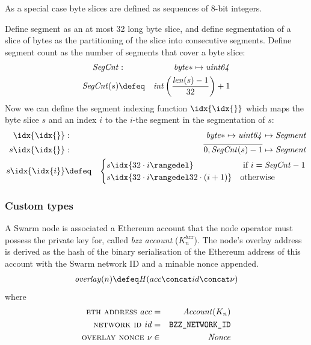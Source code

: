 %
As a special case byte slices are defined as sequences of 8-bit integers.
%
\begin{definition}[segmentation]
\label{def:segmentation}
Define segment as an at most 32 long byte slice, and define  segmentation of a slice of bytes as the partitioning of the slice into consecutive segments. 
%
Define segment count as the number of segments that cover a byte slice:
\begin{eqnarray}
\mathit{SegCnt}&:&\mathit{byte}*\mapsto\mathit{uint64}\\
\mathit{SegCnt}(s)&\defeq&\mathit{int}\left(\frac{\mathit{len}(s)-1}{32}\right)+1 
\end{eqnarray}
%
Now we can define the segment indexing function 
$\idx{\idx{}}$ which maps the byte slice $s$ and an index $i$ to the $i$-the segment in the segmentation of $s$:
\begin{eqnarray}
\idx{\idx{}}& : & \mathit{byte}{*}\mapsto\mathit{uint64}\mapsto\mathit{Segment}\\
s\idx{\idx{}}&:&\overline{0,\mathit{SegCnt}(s)-1}\mapsto\mathit{Segment}\\ 
s\idx{\idx{i}}&\defeq&\begin{cases}s\idx{32\cdot i\rangedel} &\text{ if } i = \mathit{SegCnt}-1\\
s\idx{32\cdot i\rangedel 32\cdot(i+1)} &\text{otherwise}
\end{cases}
\end{eqnarray}
\end{definition}

\subsubsection{Custom types}


\begin{definition}\label{def:overlay}
%
A Swarm node is associated a Ethereum account that the node operator must possess the private key for, called \emph{bzz account} ($K_n^\mathit{bzz}$). The node's overlay address is derived as the hash of the binary serialisation of the Ethereum address of this account with the Swarm network ID and a minable nonce appended. 
%
\begin{eqnarray}
\mathit{overlay}(n) \defeq \mathit{H}(acc\concat id\concat \nu)      
\end{eqnarray}
where
\begin{eqnarray}
\textsc{eth address } acc&=& \mathit{Account}(K_n)\\
\textsc{network id } id&=& \texttt{BZZ\_NETWORK\_ID}\\
\textsc{overlay nonce } \nu&\in&\mathit{Nonce}
\end{eqnarray}
\end{definition}


